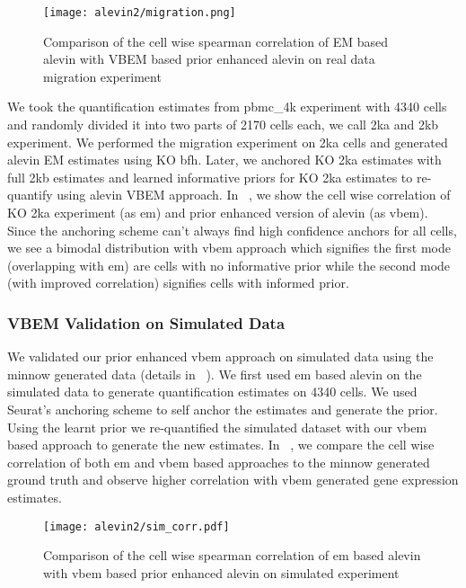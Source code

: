   \begin{figure}[!htb]
      \centering
    \texttt{[image: alevin2/migration.png]}
    \caption{ Comparison of the cell wise spearman correlation of EM based alevin with VBEM based
	prior enhanced alevin on real data migration experiment}
    \label{fig:alv2_real_val}
  \end{figure}

We took the quantification estimates from pbmc\_4k experiment with 4340 cells and randomly divided it into
two parts of 2170 cells each, we call 2ka and 2kb experiment. We performed the migration experiment on
2ka cells and generated alevin EM estimates using KO bfh. Later, we anchored KO 2ka estimates 
with full 2kb estimates and learned informative priors for KO 2ka estimates to re-quantify using alevin VBEM
approach. In ~, we show the cell wise correlation of KO 2ka experiment (as em) and prior
enhanced version of alevin (as vbem). Since the anchoring scheme can't always find high confidence anchors for 
all cells, we see a bimodal distribution with vbem approach which signifies the first mode (overlapping 
with em) are cells with no informative prior while the second mode (with improved correlation)
signifies cells with informed prior.

\subsubsection{VBEM Validation on Simulated Data}
We validated our prior enhanced vbem approach on simulated data using the minnow generated data (details in
~). We first used em based alevin on the simulated data to generate quantification
estimates on 4340 cells. We used Seurat's anchoring scheme to self anchor the estimates and generate the
prior. Using the learnt prior we re-quantified the simulated dataset with our vbem based approach to generate 
the new estimates. In ~, we compare the cell wise correlation of both em and vbem
based approaches to the minnow generated ground truth and observe higher correlation with vbem generated
gene expression estimates.

  \begin{figure}[!htb]
      \centering
    \texttt{[image: alevin2/sim\_corr.pdf]}
    \caption{ Comparison of the cell wise spearman correlation of em based alevin with vbem based
	prior enhanced alevin on simulated experiment}
    \label{fig:alv2_sim_val}
  \end{figure}

